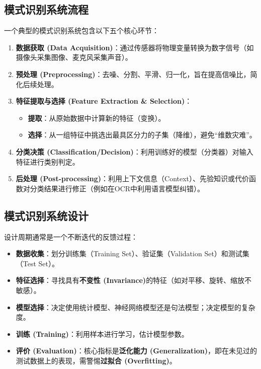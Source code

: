 \documentclass[a4paper, 11pt]{ctexart}
\begin{document}
\subsection{模式识别系统流程}
一个典型的模式识别系统包含以下五个核心环节：
\begin{enumerate}
    \item \textbf{数据获取 (Data Acquisition)}：通过传感器将物理变量转换为数字信号（如摄像头采集图像、麦克风采集声音）。
    \item \textbf{预处理 (Preprocessing)}：去噪、分割、平滑、归一化，旨在提高信噪比，简化后续处理。
    \item \textbf{特征提取与选择 (Feature Extraction \& Selection)}：
    \begin{itemize}
        \item \textbf{提取}：从原始数据中计算新的特征（变换）。
        \item \textbf{选择}：从一组特征中挑选出最具区分力的子集（降维），避免“维数灾难”。
    \end{itemize}
    \item \textbf{分类决策 (Classification/Decision)}：利用训练好的模型（分类器）对输入特征进行类别判定。
    \item \textbf{后处理 (Post-processing)}：利用上下文信息（Context）、先验知识或代价函数对分类结果进行修正（例如在OCR中利用语言模型纠错）。
\end{enumerate}

\subsection{模式识别系统设计}
设计周期通常是一个不断迭代的反馈过程：
\begin{itemize}
    \item \textbf{数据收集}：划分训练集（Training Set）、验证集（Validation Set）和测试集（Test Set）。
    \item \textbf{特征选择}：寻找具有\textbf{不变性 (Invariance)}的特征（如对平移、旋转、缩放不敏感）。
    \item \textbf{模型选择}：决定使用统计模型、神经网络模型还是句法模型；决定模型的复杂度。
    \item \textbf{训练 (Training)}：利用样本进行学习，估计模型参数。
    \item \textbf{评价 (Evaluation)}：核心指标是\textbf{泛化能力 (Generalization)}，即在未见过的测试数据上的表现，需警惕\textbf{过拟合 (Overfitting)}。
\end{itemize}
\end{document}
